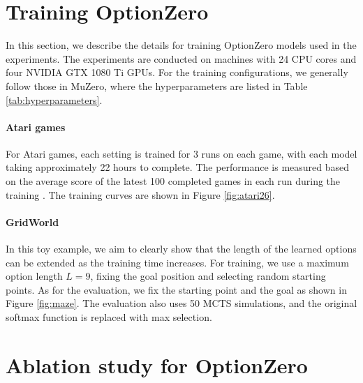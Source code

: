 \section{Training OptionZero}
\label{appendix:experiment-setup}

In this section, we describe the details for training OptionZero models used in the experiments.
The experiments are conducted on machines with 24 CPU cores and four NVIDIA GTX 1080 Ti GPUs.
For the training configurations, we generally follow those in MuZero, where the hyperparameters are listed in Table \ref{tab:hyperparameters}.


\paragraph{Atari games}
For Atari games, each setting is trained for 3 runs on each game, with each model taking approximately 22 hours to complete.
The performance is measured based on the average score of the latest 100 completed games in each run during the training \cite{hessel_muesli_2021}.
The training curves are shown in Figure \ref{fig:atari26}.




\paragraph{GridWorld}
In this toy example, we aim to clearly show that the length of the learned options can be extended as the training time increases.
For training, we use a maximum option length $L = 9$, fixing the goal position and selecting random starting points.
As for the evaluation, we fix the starting point and the goal as shown in Figure \ref{fig:maze}.
The evaluation also uses 50 MCTS simulations, and the original softmax function is replaced with max selection.

\clearpage

\section{Ablation study for OptionZero}

